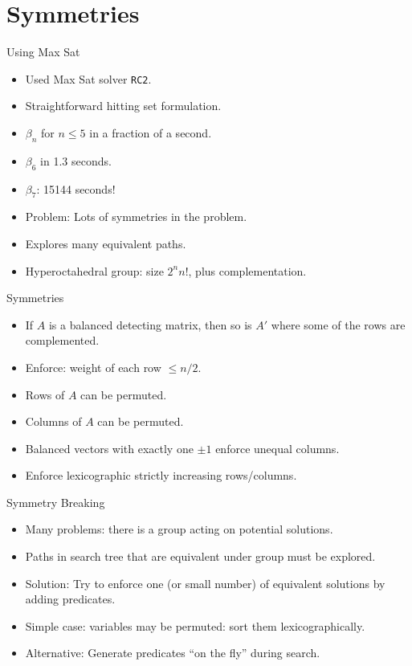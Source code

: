 
\section{Symmetries}
\label{sec:symmetry}
\begin{frame}{Using Max Sat}
  \begin{itemize}
  \item Used Max Sat solver {\tt RC2}.
  \item Straightforward hitting set formulation.
  \item $\beta_n$ for $n\le 5$ in a fraction of a second.
  \item $\beta_6$ in 1.3 seconds.
  \item $\beta_7$: 15144 seconds!
  \item Problem: Lots of symmetries in the problem.
  \item Explores many equivalent paths.
  \item Hyperoctahedral group: size $2^n n!$, plus complementation.
  \end{itemize}
\end{frame}
\begin{frame}{Symmetries}
  \begin{itemize}
  \item If $A$ is a balanced detecting matrix, then so is $A'$ where
    some of the rows are complemented.
  \item Enforce: weight of each row $\le n/2$.
  \item Rows of $A$ can be permuted.
  \item Columns of $A$ can be permuted.
  \item Balanced vectors with exactly one $\pm 1$ enforce unequal
    columns.
  \item Enforce lexicographic strictly increasing rows/columns.
  \end{itemize}
\end{frame}
\begin{frame}{Symmetry Breaking}
  \begin{itemize}
  \item Many problems: there is a group acting on potential solutions.
  \item Paths in search tree that are equivalent under group must be
    explored.
  \item Solution: Try to enforce one (or small number) of equivalent
    solutions by adding predicates.
  \item Simple case: variables may be permuted: sort them lexicographically.
  \item Alternative: Generate predicates ``on the fly'' during search.
  \end{itemize}
  
\end{frame}
